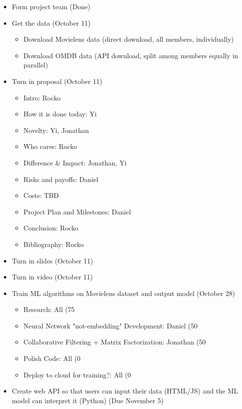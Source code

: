 \documentclass[sigchi, 12pt, nonacm=true, timestamp=true, screen=true]{acmart}
\begin{document}
\begin{itemize}
  \item Form project team (Done)
  \item Get the data (October 11)
    \begin{itemize}
      \item Download Movielens data (direct download, all members, individually) 
      \item Download OMDB data (API download, split among members equally in parallel)
    \end{itemize}
  \item Turn in proposal (October 11)
    \begin{itemize}
      \item Intro: Rocko
      \item How it is done today: Yi
      \item Novelty: Yi, Jonathan
      \item Who cares: Rocko
      \item Difference & Impact: Jonathan, Yi
      \item Risks and payoffs: Daniel
      \item Costs: TBD
      \item Project Plan and Milestones: Daniel
      \item Conclusion: Rocko
      \item Bibliography: Rocko
    \end{itemize}
  \item Turn in slides (October 11)
  \item Turn in video (October 11)
  \item Train ML algorithms on Movielens dataset and output model (October 28)
    \begin{itemize}
      \item Research: All (75%
      \item Neural Network "not-embedding" Development: Daniel (50%
      \item Collaborative Filtering + Matrix Factorization: Jonathan (50%
      \item Polish Code: All (0%
      \item Deploy to cloud for training?: All (0%
    \end{itemize}
  \item Create web API so that users can input their data (HTML/JS) and the ML model can interpret it (Python) (Due November 5)
    \begin{itemize}

\end{itemize}
\end{itemize}
\end{document}
